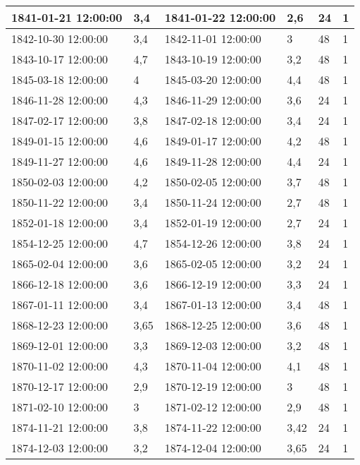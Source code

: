 \begin{longtable}{|p{3cm}|p{2.1cm}|p{3cm}|p{2cm}|l|l|}
        1841-01-21 12:00:00 & 3,4 & 1841-01-22 12:00:00 & 2,6 & 24 & 1 \\ \hline
        1842-10-30 12:00:00 & 3,4 & 1842-11-01 12:00:00 & 3 & 48 & 1 \\ \hline
        1843-10-17 12:00:00 & 4,7 & 1843-10-19 12:00:00 & 3,2 & 48 & 1 \\ \hline
        1845-03-18 12:00:00 & 4 & 1845-03-20 12:00:00 & 4,4 & 48 & 1 \\ \hline
        1846-11-28 12:00:00 & 4,3 & 1846-11-29 12:00:00 & 3,6 & 24 & 1 \\ \hline
        1847-02-17 12:00:00 & 3,8 & 1847-02-18 12:00:00 & 3,4 & 24 & 1 \\ \hline
        1849-01-15 12:00:00 & 4,6 & 1849-01-17 12:00:00 & 4,2 & 48 & 1 \\ \hline
        1849-11-27 12:00:00 & 4,6 & 1849-11-28 12:00:00 & 4,4 & 24 & 1 \\ \hline
        1850-02-03 12:00:00 & 4,2 & 1850-02-05 12:00:00 & 3,7 & 48 & 1 \\ \hline
        1850-11-22 12:00:00 & 3,4 & 1850-11-24 12:00:00 & 2,7 & 48 & 1 \\ \hline
        1852-01-18 12:00:00 & 3,4 & 1852-01-19 12:00:00 & 2,7 & 24 & 1 \\ \hline
        1854-12-25 12:00:00 & 4,7 & 1854-12-26 12:00:00 & 3,8 & 24 & 1 \\ \hline
        1865-02-04 12:00:00 & 3,6 & 1865-02-05 12:00:00 & 3,2 & 24 & 1 \\ \hline
        1866-12-18 12:00:00 & 3,6 & 1866-12-19 12:00:00 & 3,3 & 24 & 1 \\ \hline
        1867-01-11 12:00:00 & 3,4 & 1867-01-13 12:00:00 & 3,4 & 48 & 1 \\ \hline
        1868-12-23 12:00:00 & 3,65 & 1868-12-25 12:00:00 & 3,6 & 48 & 1 \\ \hline
        1869-12-01 12:00:00 & 3,3 & 1869-12-03 12:00:00 & 3,2 & 48 & 1 \\ \hline
        1870-11-02 12:00:00 & 4,3 & 1870-11-04 12:00:00 & 4,1 & 48 & 1 \\ \hline
        1870-12-17 12:00:00 & 2,9 & 1870-12-19 12:00:00 & 3 & 48 & 1 \\ \hline
        1871-02-10 12:00:00 & 3 & 1871-02-12 12:00:00 & 2,9 & 48 & 1 \\ \hline
        1874-11-21 12:00:00 & 3,8 & 1874-11-22 12:00:00 & 3,42 & 24 & 1 \\ \hline
        1874-12-03 12:00:00 & 3,2 & 1874-12-04 12:00:00 & 3,65 & 24 & 1 \\ \hline

\end{longtable}
